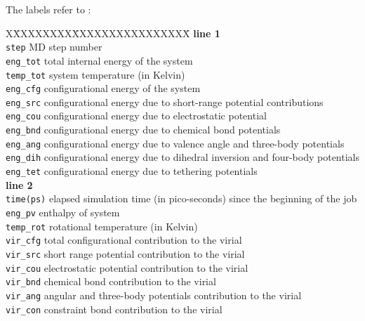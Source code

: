 \noindent The labels refer to :
\begin{tabbing}
X\=XXXXXXXX\=XXXXXXXXXXXXXXXX\=\kill
{\bf line 1} \\
\> {\tt step}      \> MD step number \\
\> {\tt eng\_tot}  \> total internal energy of the system \\
\> {\tt temp\_tot} \> system temperature (in Kelvin) \\
\> {\tt eng\_cfg}  \> configurational energy of the system \\
\> {\tt eng\_src}  \> configurational energy due to short-range potential contributions \\
\> {\tt eng\_cou}  \> configurational energy due to electrostatic potential \\
\> {\tt eng\_bnd}  \> configurational energy due to chemical bond potentials \\
\> {\tt eng\_ang}  \> configurational energy due to valence angle and three-body potentials \\
\> {\tt eng\_dih}  \> configurational energy due to dihedral inversion and four-body potentials \\
\> {\tt eng\_tet}  \> configurational energy due to tethering potentials \\
{\bf line 2} \\
\> {\tt time(ps)}  \> elapsed simulation time (in pico-seconds) since the beginning of the job \\
\> {\tt eng\_pv}   \> enthalpy of system \\
\> {\tt temp\_rot} \> rotational temperature (in Kelvin) \\
\> {\tt vir\_cfg}  \> total configurational contribution to the virial \\
\> {\tt vir\_src}  \> short range potential contribution to the virial \\
\> {\tt vir\_cou}  \> electrostatic potential contribution to the virial \\
\> {\tt vir\_bnd}  \> chemical bond contribution to the virial \\
\> {\tt vir\_ang}  \> angular and three-body potentials contribution to the virial \\
\> {\tt vir\_con}  \> constraint bond contribution to the virial \\

\end{tabbing}
